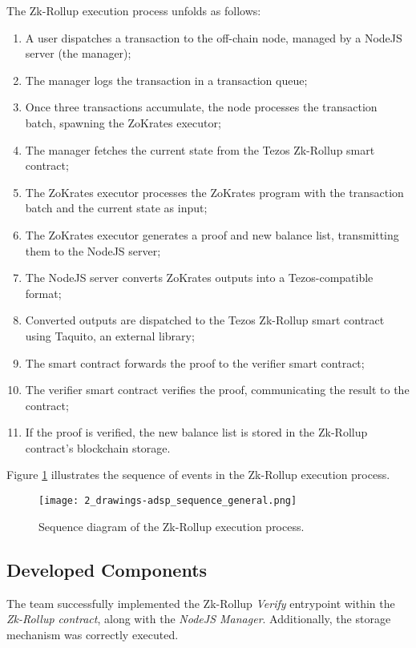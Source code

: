 The Zk-Rollup execution process unfolds as follows:
\begin{enumerate}
    \item A user dispatches a transaction to the off-chain node, managed by a NodeJS server (the manager);
    \item The manager logs the transaction in a transaction queue;
    \item Once three transactions accumulate, the node processes the transaction batch, spawning the ZoKrates executor;
    \item The manager fetches the current state from the Tezos Zk-Rollup smart contract;
    \item The ZoKrates executor processes the ZoKrates program with the transaction batch and the current state as input;
    \item The ZoKrates executor generates a proof and new balance list, transmitting them to the NodeJS server;
    \item The NodeJS server converts ZoKrates outputs into a Tezos-compatible format;
    \item Converted outputs are dispatched to the Tezos Zk-Rollup smart contract using Taquito, an external library;
    \item The smart contract forwards the proof to the verifier smart contract;
    \item The verifier smart contract verifies the proof, communicating the result to the contract;
    \item If the proof is verified, the new balance list is stored in the Zk-Rollup contract's blockchain storage.
\end{enumerate}

Figure \ref{fig:2_drawings-adsp_sequence_general.png} illustrates the sequence of events in the Zk-Rollup execution process.

\begin{figure}[ht]
  \centering
  \texttt{[image: 2\_drawings-adsp\_sequence\_general.png]}
  \caption[Sequence Zk-Rollup]{Sequence diagram of the Zk-Rollup execution process.}  
  \label{fig:2_drawings-adsp_sequence_general.png}
\end{figure} 

\subsection{Developed Components}
The team successfully implemented the Zk-Rollup \textit{Verify} entrypoint within the \textit{Zk-Rollup contract}, along with the \textit{NodeJS Manager}. Additionally, the storage mechanism was correctly executed.

